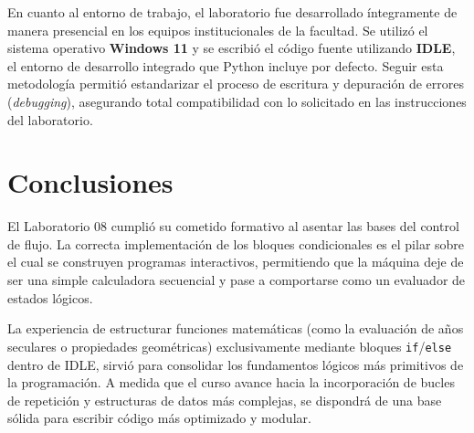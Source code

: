 \documentclass[11pt]{article}
\begin{document}
En cuanto al entorno de trabajo, el laboratorio fue desarrollado íntegramente de manera presencial en los equipos institucionales de la facultad. Se utilizó el sistema operativo \textbf{Windows 11} y se escribió el código fuente utilizando \textbf{IDLE}, el entorno de desarrollo integrado que Python incluye por defecto. Seguir esta metodología permitió estandarizar el proceso de escritura y depuración de errores (\textit{debugging}), asegurando total compatibilidad con lo solicitado en las instrucciones del laboratorio.

\section{Conclusiones}

El Laboratorio 08 cumplió su cometido formativo al asentar las bases del control de flujo. La correcta implementación de los bloques condicionales es el pilar sobre el cual se construyen programas interactivos, permitiendo que la máquina deje de ser una simple calculadora secuencial y pase a comportarse como un evaluador de estados lógicos.

La experiencia de estructurar funciones matemáticas (como la evaluación de años seculares o propiedades geométricas) exclusivamente mediante bloques \texttt{if}/\texttt{else} dentro de IDLE, sirvió para consolidar los fundamentos lógicos más primitivos de la programación. A medida que el curso avance hacia la incorporación de bucles de repetición y estructuras de datos más complejas, se dispondrá de una base sólida para escribir código más optimizado y modular.
\end{document}
